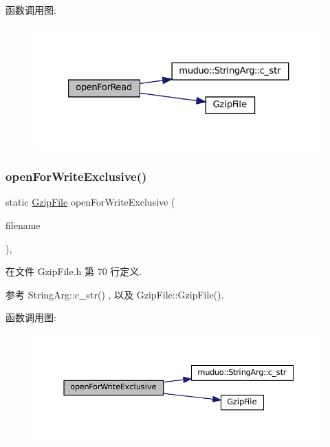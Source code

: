 函数调用图\+:
\nopagebreak
\begin{figure}[H]
\begin{center}
\leavevmode
\includegraphics[width=327pt]{classmuduo_1_1GzipFile_a0a3314e3024363b639db1f864586647a_cgraph}
\end{center}
\end{figure}
\mbox{\label{classmuduo_1_1GzipFile_afc3a38fb0012c6e377aca37925f98c4f}} 
\subsubsection{\texorpdfstring{open\+For\+Write\+Exclusive()}{openForWriteExclusive()}}
{\footnotesize\ttfamily static \hyperlink{classmuduo_1_1GzipFile}{Gzip\+File} open\+For\+Write\+Exclusive (\begin{DoxyParamCaption}\item[{\hyperlink{classmuduo_1_1StringArg}{String\+Arg}}]{filename }\end{DoxyParamCaption})\hspace{0.3cm}{\ttfamily [inline]}, {\ttfamily [static]}}



在文件 Gzip\+File.\+h 第 70 行定义.



参考 String\+Arg\+::c\+\_\+str() , 以及 Gzip\+File\+::\+Gzip\+File().

函数调用图\+:
\nopagebreak
\begin{figure}[H]
\begin{center}
\leavevmode
\includegraphics[width=350pt]{classmuduo_1_1GzipFile_afc3a38fb0012c6e377aca37925f98c4f_cgraph}
\end{center}
\end{figure}
\mbox{\label{classmuduo_1_1GzipFile_ab3ebedf22d289ebd69792c1590035b57}} 
